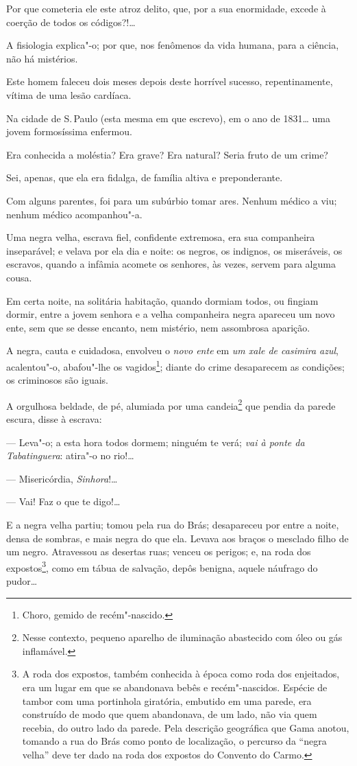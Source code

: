Por que cometeria ele este atroz delito, que, por a sua enormidade,
excede à coerção de todos os códigos?!\ldots{}

A fisiologia explica"-o; por que, nos fenômenos da vida humana, para a
ciência, não há mistérios.

Este homem faleceu dois meses depois deste horrível sucesso,
repentinamente, vítima de uma lesão cardíaca.

\asterisc

Na cidade de S.\,Paulo (esta mesma em que escrevo), em o ano de
1831\ldots{} uma jovem formosíssima enfermou.

Era conhecida a moléstia? Era grave? Era natural? Seria fruto de um
crime?

Sei, apenas, que ela era fidalga, de família altiva e preponderante.

Com alguns parentes, foi para um subúrbio tomar ares. Nenhum médico a
viu; nenhum médico acompanhou"-a.

Uma negra velha, escrava fiel, confidente extremosa, era sua companheira
inseparável; e velava por ela dia e noite: os negros, os indignos, os
miseráveis, os escravos, quando a infâmia acomete os senhores, às vezes,
servem para alguma cousa.

Em certa noite, na solitária habitação, quando dormiam todos, ou fingiam
dormir, entre a jovem senhora e a velha companheira negra apareceu um
novo ente, sem que se desse encanto, nem mistério, nem assombrosa
aparição.

A negra, cauta e cuidadosa, envolveu o \emph{novo ente} em \emph{um xale
de casimira azul}, acalentou"-o, abafou"-lhe os vagidos\footnote{Choro,
  gemido de recém"-nascido.}; diante do crime desaparecem as condições;
os criminosos são iguais.

A orgulhosa beldade, de pé, alumiada por uma candeia\footnote{Nesse
  contexto, pequeno aparelho de iluminação abastecido com óleo ou gás
  inflamável.} que pendia da parede escura, disse à escrava:

  --- Leva"-o; a esta hora todos dormem; ninguém te verá; \emph{vai à
  ponte da Tabatinguera}: atira"-o no rio!\ldots{}

  --- Misericórdia, \emph{Sinhora}!\ldots{}

  --- Vai! Faz o que te digo!\ldots{}

E a negra velha partiu; tomou pela rua do Brás; desapareceu por entre a
noite, densa de sombras, e mais negra do que ela. Levava aos braços o
mesclado filho de um negro. Atravessou as desertas ruas; venceu os
perigos; e, na roda dos expostos\footnote{A roda dos expostos, também
  conhecida à época como roda dos enjeitados, era um lugar em que se
  abandonava bebês e recém"-nascidos. Espécie de tambor com uma
  portinhola giratória, embutido em uma parede, era construído de modo
  que quem abandonava, de um lado, não via quem recebia, do outro lado
  da parede. Pela descrição geográfica que Gama anotou, tomando a rua do
  Brás como ponto de localização, o percurso da ``negra velha'' deve ter
  dado na roda dos expostos do Convento do Carmo.}, como em tábua de
salvação, depôs benigna, aquele náufrago do pudor\ldots{}

